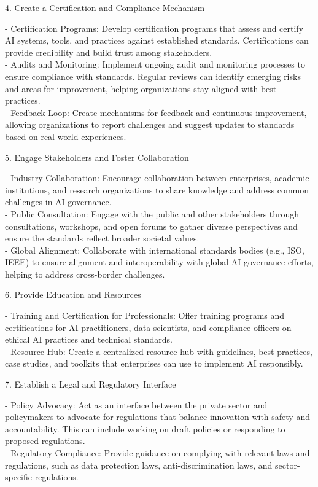 4. Create a Certification and Compliance Mechanism

- Certification Programs: Develop certification programs that assess and
certify AI systems, tools, and practices against established standards.
Certifications can provide credibility and build trust among
stakeholders.\\
- Audits and Monitoring: Implement ongoing audit and monitoring
processes to ensure compliance with standards. Regular reviews can
identify emerging risks and areas for improvement, helping organizations
stay aligned with best practices.\\
- Feedback Loop: Create mechanisms for feedback and continuous
improvement, allowing organizations to report challenges and suggest
updates to standards based on real-world experiences.

5. Engage Stakeholders and Foster Collaboration

- Industry Collaboration: Encourage collaboration between enterprises,
academic institutions, and research organizations to share knowledge and
address common challenges in AI governance.\\
- Public Consultation: Engage with the public and other stakeholders
through consultations, workshops, and open forums to gather diverse
perspectives and ensure the standards reflect broader societal values.\\
- Global Alignment: Collaborate with international standards bodies
(e.g., ISO, IEEE) to ensure alignment and interoperability with global
AI governance efforts, helping to address cross-border challenges.

6. Provide Education and Resources

- Training and Certification for Professionals: Offer training programs
and certifications for AI practitioners, data scientists, and compliance
officers on ethical AI practices and technical standards.\\
- Resource Hub: Create a centralized resource hub with guidelines, best
practices, case studies, and toolkits that enterprises can use to
implement AI responsibly.

7. Establish a Legal and Regulatory Interface

- Policy Advocacy: Act as an interface between the private sector and
policymakers to advocate for regulations that balance innovation with
safety and accountability. This can include working on draft policies or
responding to proposed regulations.\\
- Regulatory Compliance: Provide guidance on complying with relevant
laws and regulations, such as data protection laws, anti-discrimination
laws, and sector-specific regulations.

